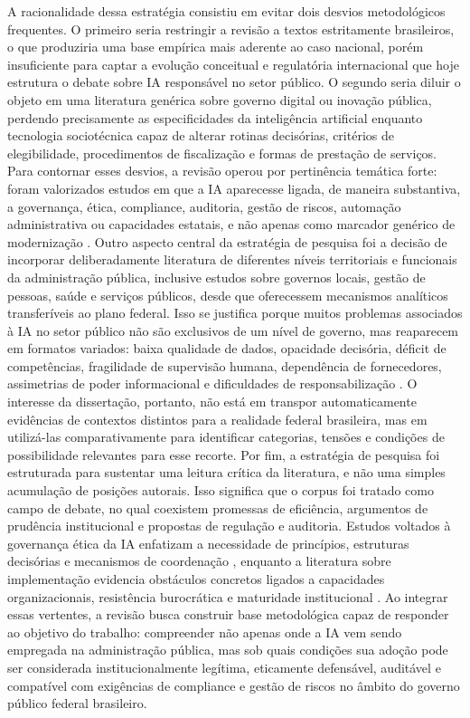 \documentclass[12pt,a4paper]{article}
\begin{document}
A racionalidade dessa estratégia consistiu em evitar dois desvios metodológicos frequentes. O primeiro seria restringir a revisão a textos estritamente brasileiros, o que produziria uma base empírica mais aderente ao caso nacional, porém insuficiente para captar a evolução conceitual e regulatória internacional que hoje estrutura o debate sobre IA responsável no setor público. O segundo seria diluir o objeto em uma literatura genérica sobre governo digital ou inovação pública, perdendo precisamente as especificidades da inteligência artificial enquanto tecnologia sociotécnica capaz de alterar rotinas decisórias, critérios de elegibilidade, procedimentos de fiscalização e formas de prestação de serviços. Para contornar esses desvios, a revisão operou por pertinência temática forte: foram valorizados estudos em que a IA aparecesse ligada, de maneira substantiva, a governança, ética, compliance, auditoria, gestão de riscos, automação administrativa ou capacidades estatais, e não apenas como marcador genérico de modernização \autocite{alhosani2024opportunities} \autocite{david2023understanding} \autocite{pi2021machine}.
Outro aspecto central da estratégia de pesquisa foi a decisão de incorporar deliberadamente literatura de diferentes níveis territoriais e funcionais da administração pública, inclusive estudos sobre governos locais, gestão de pessoas, saúde e serviços públicos, desde que oferecessem mecanismos analíticos transferíveis ao plano federal. Isso se justifica porque muitos problemas associados à IA no setor público não são exclusivos de um nível de governo, mas reaparecem em formatos variados: baixa qualidade de dados, opacidade decisória, déficit de competências, fragilidade de supervisão humana, dependência de fornecedores, assimetrias de poder informacional e dificuldades de responsabilização \autocite{yiitcanlar2022artificial} \autocite{chilunjika2022artificial} \autocite{cho2023human} \autocite{lemes2020o}. O interesse da dissertação, portanto, não está em transpor automaticamente evidências de contextos distintos para a realidade federal brasileira, mas em utilizá-las comparativamente para identificar categorias, tensões e condições de possibilidade relevantes para esse recorte.
Por fim, a estratégia de pesquisa foi estruturada para sustentar uma leitura crítica da literatura, e não uma simples acumulação de posições autorais. Isso significa que o corpus foi tratado como campo de debate, no qual coexistem promessas de eficiência, argumentos de prudência institucional e propostas de regulação e auditoria. Estudos voltados à governança ética da IA enfatizam a necessidade de princípios, estruturas decisórias e mecanismos de coordenação \autocite{sigfrids2022how} \autocite{batool2025ai}, enquanto a literatura sobre implementação evidencia obstáculos concretos ligados a capacidades organizacionais, resistência burocrática e maturidade institucional \autocite{sharma2021implementing} \autocite{melo2026competencias}. Ao integrar essas vertentes, a revisão busca construir base metodológica capaz de responder ao objetivo do trabalho: compreender não apenas onde a IA vem sendo empregada na administração pública, mas sob quais condições sua adoção pode ser considerada institucionalmente legítima, eticamente defensável, auditável e compatível com exigências de compliance e gestão de riscos no âmbito do governo público federal brasileiro.
\end{document}
